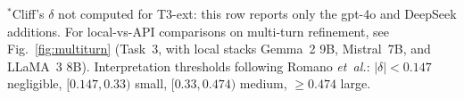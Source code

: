 \documentclass[sn-nature]{sn-jnl}
\begin{document}
\begin{appendices}
\begin{table}[h]
{\begin{tabular}{@{}lcccc@{}}
\bottomrule
\end{tabular}%
}
\par\smallskip\raggedright\footnotesize
$^{\ast}$Cliff's $\delta$ not computed for T3-ext: this row reports only the gpt-4o and DeepSeek additions. For local-vs-API comparisons on multi-turn refinement, see Fig.~\ref{fig:multiturn} (Task~3, with local stacks Gemma~2 9B, Mistral~7B, and LLaMA~3 8B). Interpretation thresholds following Romano \emph{et~al.}\cite{romano2006appropriate}: $|\delta|{<}0.147$ negligible, $[0.147, 0.33)$ small, $[0.33, 0.474)$ medium, $\geq 0.474$ large.
\end{table}

\end{appendices}


\end{document}
